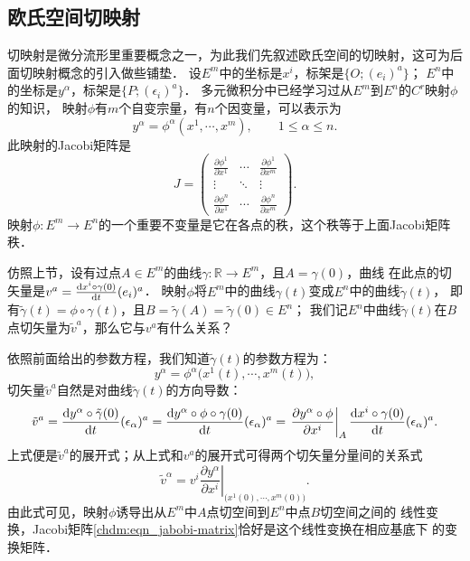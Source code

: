 \subsection{欧氏空间切映射}
切映射是微分流形里重要概念之一，为此我们先叙述欧氏空间的切映射，这可为后面切映射概念的引入做些铺垫．
设$E^m$中的坐标是$x^i$，标架是$\{O;(e_i)^a\}$；
$E^n$中的坐标是$y^\alpha$，标架是$\{P;(\epsilon_i)^a\}$．
多元微积分中已经学习过从$E^m$到$E^n$的$C^r$映射$\phi$的知识，
映射$\phi$有$m$个自变宗量，有$n$个因变量，可以表示为
\begin{equation}
    y^\alpha = \phi^\alpha(x^1,\cdots,x^m), \qquad 1 \leqslant \alpha \leqslant n.
\end{equation}
此映射的Jacobi矩阵是
\begin{equation}\label{chdm:eqn_jabobi-matrix}
    J=\begin{pmatrix}
        \frac{\partial \phi^1}{\partial x^1} & \cdots & \frac{\partial \phi^1}{\partial x^m} \\ 
        \vdots & \ddots & \vdots \\
        \frac{\partial \phi^n}{\partial x^1} & \cdots & \frac{\partial \phi^n}{\partial x^m}
    \end{pmatrix}.
\end{equation}
映射$\phi:E^m\to E^n$的一个重要不变量是它在各点的秩，这个秩等于上面Jacobi矩阵秩．

仿照上节，设有过点$A\in E^m$的曲线$\gamma:\mathbb{R}\to E^m$，且$A=\gamma(0)$，曲线
在此点的切矢量是$v^a=\frac{{\rm d} x^i\circ\gamma(0)}{{\rm d} t}(e_i)^a$．
映射$\phi$将$E^m$中的曲线$\gamma(t)$变成$E^n$中的曲线$\tilde{\gamma}(t)$，
即有$\tilde{\gamma}(t)= \phi\circ\gamma(t)$，且$B=\tilde{\gamma}(A) =\tilde{\gamma}(0)\in E^n$；
我们记$E^n$中曲线$\tilde{\gamma}(t)$在$B$点切矢量为$\tilde{v}^a$，那么它与$v^a$有什么关系？

依照前面给出的参数方程，我们知道$\tilde{\gamma}(t)$的参数方程为：
\begin{equation}
    y^\alpha = \phi^\alpha\bigl(x^1(t),\cdots,x^m(t)\bigr),
\end{equation}
切矢量$\tilde{v}^a$自然是对曲线$\tilde{\gamma}(t)$的方向导数：
\setlength{\mathindent}{0em}
\begin{equation}\label{chdm:eqn_qysall}
    \tilde{v}^a = \frac{{\rm d} y^\alpha\circ\tilde{\gamma}(0)}{{\rm d} t}(\epsilon_\alpha)^a
    =\frac{{\rm d} y^\alpha\circ\phi\circ{\gamma}(0)}{{\rm d} t}(\epsilon_\alpha)^a
    =\left.\frac{\partial y^\alpha\circ\phi}{\partial x^i} \right|_{A}
    \frac{{\rm d} x^i\circ{\gamma}(0)}{{\rm d} t}(\epsilon_\alpha)^a .
\end{equation}\setlength{\mathindent}{2em}
上式便是$\tilde{v}^a$的展开式；从上式和$v^a$的展开式可得两个切矢量分量间的关系式
\begin{equation}\label{chdm:eqn_QieYingShe-inEV-compents}
    \tilde{v}^\alpha = v^i \left.\frac{\partial y^\alpha}{\partial x^i} 
      \right|_{\bigl(x^1(0),\cdots,x^m(0)\bigr)} .
\end{equation}
由此式可见，映射$\phi$诱导出从$E^m$中$A$点切空间到$E^n$中点$B$切空间之间的
线性变换，Jacobi矩阵\eqref{chdm:eqn_jabobi-matrix}恰好是这个线性变换在相应基底下
的变换矩阵．

